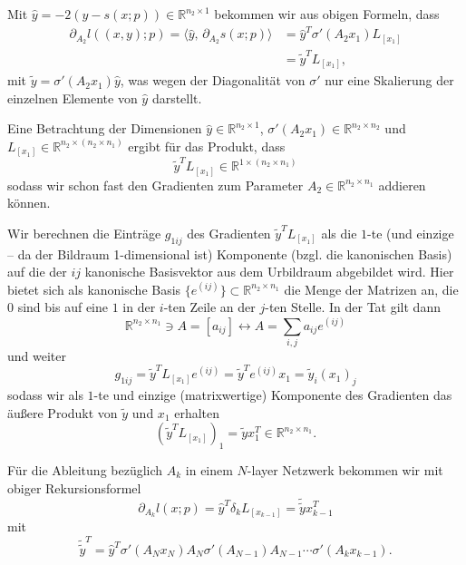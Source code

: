 \documentclass[
]{book}
\theoremstyle{definition}
\theoremstyle{definition}
\theoremstyle{definition}
\theoremstyle{definition}
\theoremstyle{remark}
\begin{document}
Mit \(\hat y = -2(y-s(x;p)) \in \mathbb R^{n_2\times 1}\) bekommen wir aus obigen Formeln, dass
\begin{equation*}
\begin{split}
\partial_{A_2}l((x,y); p) = \bigl \langle \hat y, \, \partial_{A_2}s(x;p)\bigr\rangle  &= \hat y^T
\sigma'(A_2x_1)L_{[x_1]} \\
&= \tilde y^TL_{[x_1]},
\end{split}
\end{equation*}
mit \(\tilde y=\sigma'(A_2x_1)\hat y\), was wegen der Diagonalität von \(\sigma'\)
nur eine Skalierung der einzelnen Elemente von \(\hat y\) darstellt.

Eine Betrachtung der Dimensionen \(\hat y \in \mathbb R^{n_2 \times 1}\),
\(\sigma'(A_2x_1)\in \mathbb R^{n_2\times n_2}\) und \(L_{[x_1]}\in \mathbb R^{n_2\times(n_2\times n_1)}\) ergibt für das Produkt, dass
\begin{equation*}
\tilde y^T L_{[x_1]} \in \mathbb R^{1\times (n_2 \times n_1)}
\end{equation*}
sodass wir schon fast den Gradienten zum Parameter \(A_2 \in \mathbb R^{n_2 \times n_1}\) addieren können.

Wir berechnen die Einträge \(g_{1ij}\) des Gradienten \(\tilde y^T L_{[x_1]}\)
als die \(1\)-te (und einzige -- da der Bildraum 1-dimensional ist) Komponente
(bzgl. die kanonischen Basis) auf die der \(ij\) kanonische Basisvektor aus dem
Urbildraum abgebildet wird. Hier bietet sich als kanonische Basis
\(\{e^{(ij)}\}\subset \mathbb R^{n_2\times n_1}\)
die Menge der Matrizen an, die \(0\) sind bis auf eine \(1\) in der \(i\)-ten Zeile an der
\(j\)-ten Stelle. In der Tat gilt dann
\begin{equation*}
\mathbb R^{n_2\times n_1}\ni A = [a_{ij}] \leftrightarrow A =
\sum_{i,j}a_{ij}e^{(ij)}
\end{equation*}
und weiter
\begin{equation*}
g_{1ij}=\tilde y^TL_{[x_1]}e^{(ij)} = \tilde y^T e^{(ij)}x_1 = \tilde y_i (x_{1})_j
\end{equation*}
sodass wir als \(1\)-te und einzige (matrixwertige) Komponente des Gradienten das
äußere Produkt von \(\tilde y\) und \(x_1\) erhalten
\begin{equation*}
(\tilde y^T L_{[x_1]})_1 = \tilde y x_1^T \in \mathbb R^{n_2 \times n_1}.
\end{equation*}

Für die Ableitung bezüglich \(A_k\) in einem \(N\)-layer Netzwerk bekommen
wir mit obiger Rekursionsformel
\begin{equation*}
\partial_{A_k} l(x;p) = \hat y^T \delta_k L_{[x_{k-1}]} = \tilde{\tilde y}
x_{k-1}^T
\end{equation*}
mit
\begin{equation*}
{\tilde {\tilde y}}^T = \hat y^T \sigma'(A_Nx_N)A_N\sigma'(A_{N-1})A_{N-1}
\dotsm \sigma'(A_kx_{k-1}).
\end{equation*}
\end{document}
